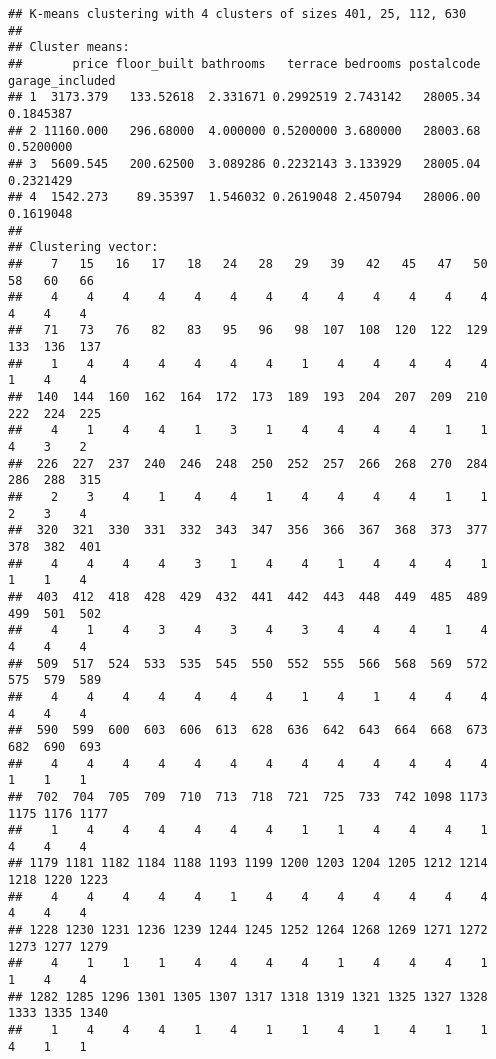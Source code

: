 \documentclass[
]{article}
\begin{document}
\begin{verbatim}
## K-means clustering with 4 clusters of sizes 401, 25, 112, 630
## 
## Cluster means:
##       price floor_built bathrooms   terrace bedrooms postalcode garage_included
## 1  3173.379   133.52618  2.331671 0.2992519 2.743142   28005.34       0.1845387
## 2 11160.000   296.68000  4.000000 0.5200000 3.680000   28003.68       0.5200000
## 3  5609.545   200.62500  3.089286 0.2232143 3.133929   28005.04       0.2321429
## 4  1542.273    89.35397  1.546032 0.2619048 2.450794   28006.00       0.1619048
## 
## Clustering vector:
##    7   15   16   17   18   24   28   29   39   42   45   47   50   58   60   66 
##    4    4    4    4    4    4    4    4    4    4    4    4    4    4    4    4 
##   71   73   76   82   83   95   96   98  107  108  120  122  129  133  136  137 
##    1    4    4    4    4    4    4    1    4    4    4    4    4    1    4    4 
##  140  144  160  162  164  172  173  189  193  204  207  209  210  222  224  225 
##    4    1    4    4    1    3    1    4    4    4    4    1    1    4    3    2 
##  226  227  237  240  246  248  250  252  257  266  268  270  284  286  288  315 
##    2    3    4    1    4    4    1    4    4    4    4    1    1    2    3    4 
##  320  321  330  331  332  343  347  356  366  367  368  373  377  378  382  401 
##    4    4    4    4    3    1    4    4    1    4    4    4    1    1    1    4 
##  403  412  418  428  429  432  441  442  443  448  449  485  489  499  501  502 
##    4    1    4    3    4    3    4    3    4    4    4    1    4    4    4    4 
##  509  517  524  533  535  545  550  552  555  566  568  569  572  575  579  589 
##    4    4    4    4    4    4    4    1    4    1    4    4    4    4    4    4 
##  590  599  600  603  606  613  628  636  642  643  664  668  673  682  690  693 
##    4    4    4    4    4    4    4    4    4    4    4    4    4    1    1    1 
##  702  704  705  709  710  713  718  721  725  733  742 1098 1173 1175 1176 1177 
##    1    4    4    4    4    4    4    1    1    4    4    4    1    4    4    4 
## 1179 1181 1182 1184 1188 1193 1199 1200 1203 1204 1205 1212 1214 1218 1220 1223 
##    4    4    4    4    4    1    4    4    4    4    4    4    4    4    4    4 
## 1228 1230 1231 1236 1239 1244 1245 1252 1264 1268 1269 1271 1272 1273 1277 1279 
##    4    1    1    1    4    4    4    4    1    4    4    4    1    1    4    4 
## 1282 1285 1296 1301 1305 1307 1317 1318 1319 1321 1325 1327 1328 1333 1335 1340 
##    1    4    4    4    1    4    1    1    4    1    4    1    1    4    1    1 

\end{verbatim}
\end{document}
